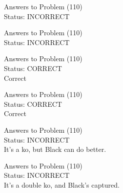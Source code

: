 \documentclass[11pt]{article}
\begin{document}
\begin{minipage}[t]{0.5\textwidth}
  {\centering
  
  Answers to Problem (110)\\
  Status: INCORRECT\\
  
  }
\end{minipage}
\begin{minipage}[t]{0.5\textwidth}
  {\centering
  
  Answers to Problem (110)\\
  Status: INCORRECT\\
  
  }
\end{minipage}
\begin{minipage}[t]{0.5\textwidth}
  {\centering
  
  Answers to Problem (110)\\
  Status: CORRECT\\
  Correct\\
  }
\end{minipage}
\begin{minipage}[t]{0.5\textwidth}
  {\centering
  
  Answers to Problem (110)\\
  Status: CORRECT\\
  Correct\\
  }
\end{minipage}
\begin{minipage}[t]{0.5\textwidth}
  {\centering
  
  Answers to Problem (110)\\
  Status: INCORRECT\\
  It's a ko, but Black can do better.\\
  }
\end{minipage}
\begin{minipage}[t]{0.5\textwidth}
  {\centering
  
  Answers to Problem (110)\\
  Status: INCORRECT\\
  It's a double ko, and Black's captured.\\
  }
\end{minipage}
\end{document}
